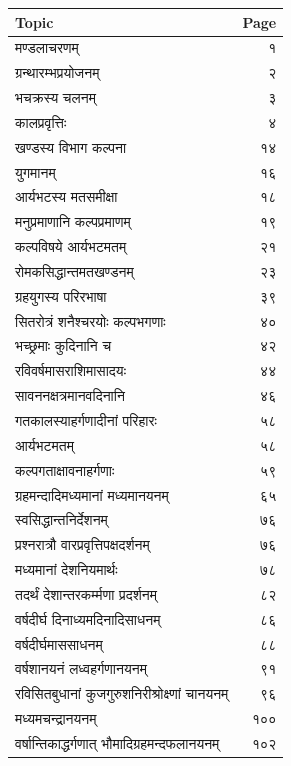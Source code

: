 \documentclass[11pt,a4paper]{article}
\newcommand{\ditem}[1]{{\devanagarifont #1}}
\newcommand{\dhead}[1]{{\devanagarifont\textbf{#1}}}
\begin{document}
\begin{center}
\begin{tabular}{@{}l@{\hspace{2em}}r@{}}
\toprule
\dhead{Topic} & \dhead{Page} \\
\midrule
\ditem{मण्डलाचरणम्} & १ \\
\ditem{ग्रन्थारम्भप्रयोजनम्} & २ \\
\ditem{भचक्रस्य चलनम्} & ३ \\
\ditem{कालप्रवृत्तिः} & ४ \\
\ditem{खण्डस्य विभाग कल्पना} & १४ \\
\ditem{युगमानम्} & १६ \\
\ditem{आर्यभटस्य मतसमीक्षा} & १८ \\
\ditem{मनुप्रमाणानि कल्पप्रमाणम्} & १९ \\
\ditem{कल्पविषये आर्यभटमतम्} & २१ \\
\ditem{रोमकसिद्धान्तमतखण्डनम्} & २३ \\
\ditem{ग्रहयुगस्य परिरभाषा} & ३९ \\
\ditem{सितरोत्रं शनैश्चरयोः कल्पभगणाः} & ४० \\
\ditem{भच्छ्रमाः कुदिनानि च} & ४२ \\
\ditem{रविवर्षमासराशिमासादयः} & ४४ \\
\ditem{सावननक्षत्रमानवदिनानि} & ४६ \\
\ditem{गतकालस्याहर्गणादीनां परिहारः} & ५८ \\
\ditem{आर्यभटमतम्} & ५८ \\
\ditem{कल्पगताक्षावनाहर्गणाः} & ५९ \\
\ditem{ग्रहमन्दादिमध्यमानां मध्यमानयनम्} & ६५ \\
\ditem{स्वसिद्धान्तनिर्देशनम्} & ७६ \\
\ditem{प्रश्नरात्रौ वारप्रवृत्तिपक्षदर्शनम्} & ७६ \\
\ditem{मध्यमानां देशनियमार्थः} & ७८ \\
\ditem{तदर्थं देशान्तरकर्म्मणा प्रदर्शनम्} & ८२ \\
\ditem{वर्षदीर्घ दिनाध्यमदिनादिसाधनम्} & ८६ \\
\ditem{वर्षदीर्घमाससाधनम्} & ८८ \\
\ditem{वर्षशानयनं लध्वहर्गणानयनम्} & ९१ \\
\ditem{रविसितबुधानां कुजगुरुशनिरीश्रोक्ष्णां चानयनम्} & ९६ \\
\ditem{मध्यमचन्द्रानयनम्} & १०० \\
\ditem{वर्षान्तिकाद्धर्गणात् भौमादिग्रहमन्दफलानयनम्} & १०२ \\
\bottomrule
\end{tabular}
\end{center}
\end{document}
